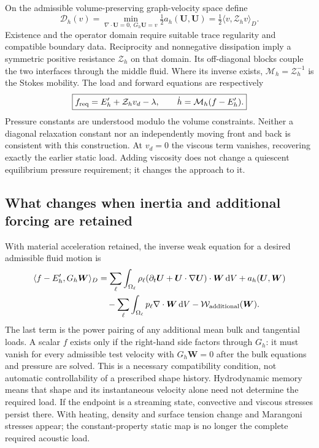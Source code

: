 On the admissible volume-preserving graph-velocity space define
\begin{equation}
 \mathcal D_h(v)=\min_{\nabla\cdot\bm U=0,\ G_h\bm U=v}
                      \tfrac12 a_h(\bm U,\bm U)
             =\tfrac12\langle v,\mathcal Z_hv\rangle_D.
 \label{eq:viscous-resistance}
\end{equation}
Existence and the operator domain require suitable trace regularity and
compatible boundary data. Reciprocity and nonnegative dissipation imply a
symmetric positive resistance $\mathcal Z_h$ on that domain. Its off-diagonal
blocks couple the two interfaces through the middle fluid. Where its inverse
exists, $\mathcal M_h=\mathcal Z_h^{-1}$ is the Stokes mobility. The load and
forward equations are respectively
\begin{equation}
 \boxed{f_{\rm req}=E'_h+\mathcal Z_hv_d-\lambda,
 \qquad \dot h=\mathcal M_h(f-E'_h).}
 \label{eq:viscous-load-and-forward}
\end{equation}
Pressure constants are understood modulo the volume constraints. Neither a
diagonal relaxation constant nor an independently moving front and back is
consistent with this construction. At $v_d=0$ the viscous term vanishes,
recovering exactly the earlier static load. Adding viscosity does not change
a quiescent equilibrium pressure requirement; it changes the approach to it.

\subsection{What changes when inertia and additional forcing are retained}
With material acceleration retained, the inverse weak equation for a desired
admissible fluid motion is
\begin{align}
 \langle f-E'_h,G_h\bm W\rangle_D
 &=\sum_\ell\int_{\Omega_\ell}\rho_\ell
       (\partial_t\bm U+\bm U\cdot\nabla\bm U)\cdot\bm W\,\mathrm d V
       +a_h(\bm U,\bm W) \nonumber\\
 &\quad-\sum_\ell\int_{\Omega_\ell}p_\ell\nabla\cdot\bm W\,\mathrm d V
       -\mathcal W_{\rm additional}(\bm W).
 \label{eq:inertial-inverse-weak}
\end{align}
The last term is the power pairing of any additional mean bulk and tangential
loads. A scalar $f$ exists only if the right-hand side factors through $G_h$:
it must vanish for every admissible test velocity with $G_h\bm W=0$ after the
bulk equations and pressure are solved. This is a necessary compatibility
condition, not automatic controllability of a prescribed shape history.
Hydrodynamic memory means that shape and its instantaneous velocity alone
need not determine the required load. If the endpoint is a streaming state,
convective and viscous stresses persist there. With heating, density and
surface tension change and Marangoni stresses appear; the constant-property
static map is no longer the complete required acoustic load.


